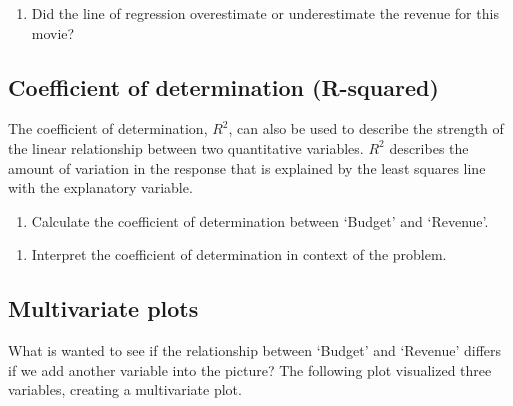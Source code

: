 \documentclass[
]{report}
\providecommand{\tightlist}{%
  \setlength{\itemsep}{0pt}\setlength{\parskip}{0pt}}
\begin{document}
\vspace{1in}

\begin{enumerate}
\def\labelenumi{\arabic{enumi}.}
\setcounter{enumi}{13}
\tightlist
\item
  Did the line of regression overestimate or underestimate the revenue for this movie?
\end{enumerate}

\vspace{1in}

\hypertarget{coefficient-of-determination-r-squared}{%
\subsection{Coefficient of determination (R-squared)}\label{coefficient-of-determination-r-squared}}

The coefficient of determination, \(R^2\), can also be used to describe the strength of the linear relationship between two quantitative variables. \(R^2\) describes the amount of variation in the response that is explained by the least squares line with the explanatory variable.

\begin{enumerate}
\def\labelenumi{\arabic{enumi}.}
\setcounter{enumi}{14}
\tightlist
\item
  Calculate the coefficient of determination between `Budget' and `Revenue'.
\end{enumerate}

\vspace{1in}

\begin{enumerate}
\def\labelenumi{\arabic{enumi}.}
\setcounter{enumi}{15}
\tightlist
\item
  Interpret the coefficient of determination in context of the problem.
\end{enumerate}

\vspace{1in}

\newpage

\hypertarget{multivariate-plots}{%
\subsection{Multivariate plots}\label{multivariate-plots}}

What is wanted to see if the relationship between `Budget' and `Revenue' differs if we add another variable into the picture? The following plot visualized three variables, creating a multivariate plot.
\end{document}
